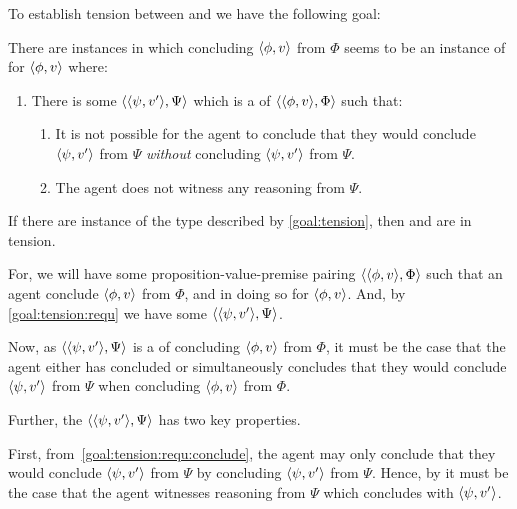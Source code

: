 \begin{note}[Goal]
  To establish tension between \ESU{} and \csN{} we have the following goal:

  \begin{goal}
    \label{goal:tension}
    There are instances in which concluding \(\langle \phi, v \rangle\) from \(\Phi\) seems to be an instance of \csN{} for \(\langle \phi, v \rangle\) where:
    \begin{enumerate}[label=\arabic*., ref=\named{G\ref{goal:tension}:\arabic*}]
    \item
      \label{goal:tension:requ}
      There is some \(\langle \langle \psi, v' \rangle, \Psi \rangle\) which is a \requ{} of \(\langle \langle \phi, v \rangle, \Phi \rangle\) such that:
      \begin{enumerate}[label=\alph*., ref=\named{G\ref{goal:tension}:1\alph*}]
      \item
        \label{goal:tension:requ:conclude}
        It is not possible for the agent to conclude that they would conclude \(\langle \psi, v' \rangle\) from \(\Psi\) \emph{without} concluding \(\langle \psi, v' \rangle\) from \(\Psi\).
      \item
        \label{goal:tension:requ:no-reason}
        The agent does not witness any reasoning from \(\Psi\).
      \end{enumerate}
    \end{enumerate}
    \vspace{-\baselineskip}
  \end{goal}

  If there are instance of the type described by \autoref{goal:tension}, then \ESU{} and \csN{} are in tension.

  For, we will have some proposition-value-premise pairing \(\langle \langle \phi, v \rangle, \Phi \rangle\) such that an agent conclude \(\langle \phi, v \rangle\) from \(\Phi\), and in doing so \csV{} for \(\langle \phi, v \rangle\).
  And, by \autoref{goal:tension:requ} we have some \requ{} \(\langle \langle \psi, v' \rangle, \Psi \rangle\).

  Now, as \(\langle \langle \psi, v' \rangle, \Psi \rangle\) is a  of concluding \(\langle \phi, v \rangle\) from \(\Phi\), it must be the case that the agent either has concluded or simultaneously concludes that they would conclude \(\langle \psi, v' \rangle\) from \(\Psi\) when concluding \(\langle \phi, v \rangle\) from \(\Phi\).

  Further, the \requ{} \(\langle \langle \psi, v' \rangle, \Psi \rangle\) has two key properties.

  First, from~\autoref{goal:tension:requ:conclude}, the agent may only conclude that they would conclude \(\langle \psi, v' \rangle\) from \(\Psi\) by concluding \(\langle \psi, v' \rangle\) from \(\Psi\).
  Hence, by \ESU{} it must be the case that the agent witnesses reasoning from \(\Psi\) which concludes with \(\langle \psi, v' \rangle\).


\end{note}
